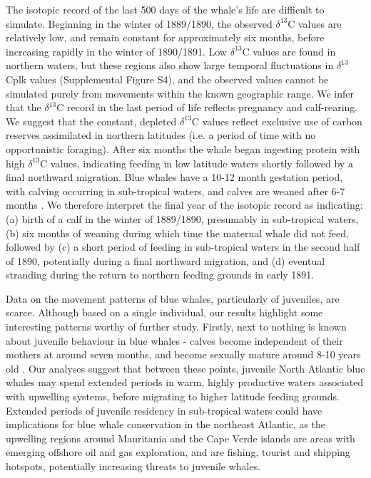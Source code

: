 \documentclass[9pt,twocolumn,twoside,lineno]{pnas-new}
\begin{document}
The isotopic record of the last 500 days of the whale's life are difficult to simulate. 
Beginning in the winter of 1889/1890, the observed $\delta^{13}$C values are relatively low, and remain constant for approximately six months, before increasing rapidly in the winter of 1890/1891. 
Low $\delta^{13}$C values are found in northern waters, but these regions also show large temporal fluctuations in $\delta^{13}$Cplk values (Supplemental Figure S4), and the observed values cannot be simulated purely from movements within the known geographic range.
We infer that the $\delta^{13}$C record in the last period of life reflects pregnancy and calf-rearing. 
We suggest that the constant, depleted $\delta^{13}$C values reflect exclusive use of carbon reserves assimilated in northern latitudes (i.e. a period of time with no opportunistic foraging). 
After six months the whale began ingesting protein with high $\delta^{13}$C  values, indicating feeding in low latitude waters shortly followed by a final northward migration. 
Blue whales have a 10-12 month gestation period, with calving occurring in sub-tropical waters, and calves are weaned after 6-7 months \cite{handbook}. 
We therefore interpret the final year of the isotopic record as indicating: (a) birth of a calf in the winter of 1889/1890, presumably in sub-tropical waters, (b) six months of weaning during which time the maternal whale did not feed, followed by (c) a short period of feeding in sub-tropical waters in the second half of 1890, potentially during a final northward migration, and (d) eventual stranding during the return to northern feeding grounds in early 1891.

Data on the movement patterns of blue whales, particularly of juveniles, are scarce. 
Although based on a single individual, our results highlight some interesting patterns worthy of further study.
Firstly, next to nothing is known about juvenile behaviour in blue whales - calves become independent of their mothers at around seven months, and become sexually mature around 8-10 years old \cite{handbook}.
Our analyses suggest that between these points, juvenile North Atlantic blue whales may spend extended periods in warm, highly productive waters associated with upwelling systems, before migrating to higher latitude feeding grounds.
Extended periods of juvenile residency in sub-tropical waters could have implications for blue whale conservation in the northeast Atlantic, as the upwelling regions around Mauritania and the Cape Verde islands are areas with emerging offshore oil and gas exploration, and are fishing, tourist and shipping hotspots, potentially increasing threats to juvenile whales. 
\end{document}
